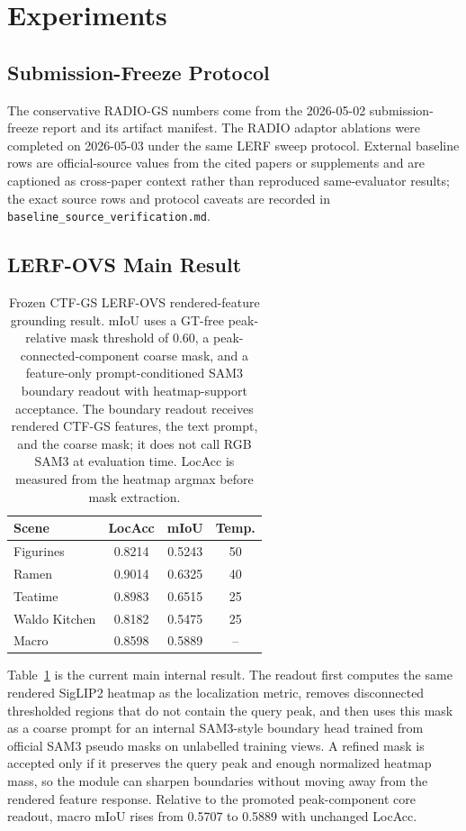 \documentclass[10pt,twocolumn,letterpaper]{article}
\newcommand{\method}{CTF-GS}
\newcommand{\project}{RADIO-GS}
\begin{document}
\section{Experiments}

\subsection{Submission-Freeze Protocol}

The conservative \project{} numbers come from the 2026-05-02 submission-freeze
report and its artifact manifest. The RADIO adaptor ablations were completed on
2026-05-03 under the same LERF sweep protocol. External baseline rows are
official-source values from the cited papers or supplements and are captioned as
cross-paper context rather than reproduced same-evaluator results; the exact
source rows and protocol caveats are recorded in
\texttt{baseline\_source\_verification.md}.

\subsection{LERF-OVS Main Result}

\begin{table}[t]
\centering
\caption{Frozen \method{} LERF-OVS rendered-feature grounding result. mIoU uses a GT-free peak-relative mask threshold of 0.60, a peak-connected-component coarse mask, and a feature-only prompt-conditioned SAM3 boundary readout with heatmap-support acceptance. The boundary readout receives rendered \method{} features, the text prompt, and the coarse mask; it does not call RGB SAM3 at evaluation time. LocAcc is measured from the heatmap argmax before mask extraction.}
\label{tab:lerf}
\begin{tabular}{lccc}
\toprule
Scene & LocAcc & mIoU & Temp. \\
\midrule
Figurines & 0.8214 & 0.5243 & 50 \\
Ramen & 0.9014 & 0.6325 & 40 \\
Teatime & 0.8983 & 0.6515 & 25 \\
Waldo Kitchen & 0.8182 & 0.5475 & 25 \\
\midrule
Macro & 0.8598 & 0.5889 & -- \\
\bottomrule
\end{tabular}
\end{table}

Table~\ref{tab:lerf} is the current main internal result. The readout first
computes the same rendered SigLIP2 heatmap as the localization metric, removes
disconnected thresholded regions that do not contain the query peak, and then
uses this mask as a coarse prompt for an internal SAM3-style boundary head
trained from official SAM3 pseudo masks on unlabelled training views. A refined
mask is accepted only if it preserves the query peak and enough normalized
heatmap mass, so the module can sharpen boundaries without moving away from the
rendered feature response. Relative to the promoted peak-component core readout,
macro mIoU rises from 0.5707 to 0.5889 with unchanged LocAcc.
\end{document}
